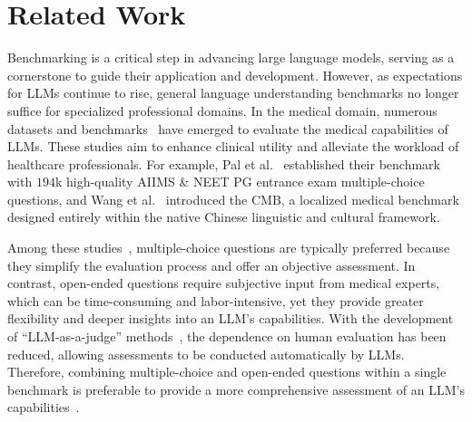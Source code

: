 \section{Related Work}
Benchmarking is a critical step in advancing large language models, serving as a cornerstone to guide their application and development. However, as expectations for LLMs continue to rise, general language understanding benchmarks no longer suffice for specialized professional domains.
In the medical domain, numerous datasets and benchmarks~\cite{pal2022medmcqa,zhang2021cblue,suthar2023artificial,singhal2023large,zhu2023promptcblue,goodman2023accuracy,rao2023assessing,lim2023benchmarking,li2023chatgpt,wang2023cmb,liu2024benchmarking,hager2024evaluation,longwell2024performance,DBLP:conf/aaai/0001WWMZWH24} have emerged to evaluate the medical capabilities of LLMs. 
These studies aim to enhance clinical utility and alleviate the workload of healthcare professionals. 
For example, Pal et al.~\cite{pal2022medmcqa} established their benchmark with $194$k high-quality AIIMS \& NEET PG entrance exam multiple-choice questions, and Wang et al.~\cite{wang2023cmb} introduced the CMB, a localized medical benchmark designed entirely within the native Chinese linguistic and cultural framework.

Among these studies~\cite{pal2022medmcqa,zhang2021cblue,suthar2023artificial,singhal2023large,zhu2023promptcblue,goodman2023accuracy,rao2023assessing,lim2023benchmarking,li2023chatgpt,wang2023cmb,liu2024benchmarking,hager2024evaluation,longwell2024performance,DBLP:conf/aaai/0001WWMZWH24}, multiple-choice questions are typically preferred because they simplify the evaluation process and offer an objective assessment.
In contrast, open-ended questions require subjective input from medical experts, which can be time-consuming and labor-intensive, yet they provide greater flexibility and deeper insights into an LLM's capabilities.
With the development of ``LLM-as-a-judge'' methods~\cite{son2024llm,cao2024compassjudger}, the dependence on human evaluation has been reduced, allowing assessments to be conducted automatically by LLMs.
Therefore, combining multiple-choice and open-ended questions within a single benchmark is preferable to provide a more comprehensive assessment of an LLM's capabilities~\cite{li2024multiple}. 

